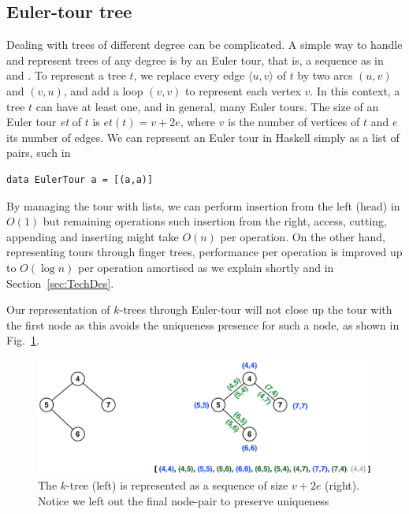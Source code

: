 \subsection{Euler-tour tree} 
\label{sec:ETt}
Dealing with trees of different degree can be complicated. A simple way to handle and represent trees of any degree is by an Euler tour, that is, a sequence as in \cite{Rand-DynGs-Algos} and \cite{WerneckR-PhD}. To represent a tree $t$, we replace every edge $\langle u,v \rangle$ of $t$ by two arcs $(u,v)$ and $(v,u)$, and add a loop $(v,v)$ to represent each vertex $v$. In this context, a tree $t$ can have at least one, and in general, many Euler tours. The size of an Euler tour \textit{et} of $t$ is $et(t) = v + 2e $, where $v$ is the number of vertices of $t$ and $e$ its number of edges. We can represent an Euler tour in Haskell simply as a list of pairs, such in 

\begin{lstlisting}
data EulerTour a = [(a,a)] 
\end{lstlisting}

By managing the tour with lists, we can perform insertion from the left (head) in $O(1)$ but remaining operations such insertion from the right, access, cutting, appending and inserting might take $O(n)$ per operation.
On the other hand, representing tours through finger trees, performance per operation is improved up to $O(\log n)$ per operation amortised as we explain shortly and in Section~\ref{sec:TechDes}. 

Our representation of $k$-trees through Euler-tour will not close up the tour with the first node as this avoids the uniqueness presence for such a node, as shown in Fig.~\ref{fig:Euler-tour}.

\begin{figure}[H]
\begin{center}
\includegraphics[scale=0.35]{./Images/Euler-tour} 
\end{center}
\caption{The $k$-tree (left) is represented as a sequence of size $v+2e$ (right). Notice we left out the final node-pair to preserve uniqueness}
\label{fig:Euler-tour}
\end{figure}


